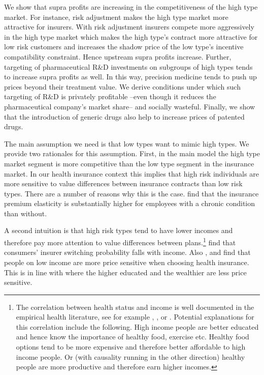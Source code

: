 \documentclass[12pt,english,a4paper]{article}
\begin{document}
We show that supra profits are increasing in the competitiveness of the high type market. For instance, risk adjustment makes the high type market more attractive for insurers. With risk adjustment insurers compete more aggressively in the high type market which makes the high type's contract more attractive for low risk customers and increases the shadow price of the low type's incentive compatibility constraint. Hence upstream supra profits increase. Further, targeting of pharmaceutical R\&D investments on subgroups of high types tends to increase supra profits as well. In this way, precision medicine tends to push up prices beyond their treatment value. We derive conditions under which such targeting of R\&D is privately profitable --even though it reduces the pharmaceutical company's market share-- and socially wasteful. Finally, we show that the introduction of generic drugs also help to increase prices of patented drugs.

The main assumption we need is that low types want to mimic high types. We provide two rationales for this assumption. First, in the main model the high type market segment is more competitive than the low type segment in the insurance market. In our health insurance context this implies that high risk individuals are more sensitive to value differences between insurance contracts than low risk types. There are a number of reasons why this is the case. \cite{Parente2004} find that the insurance premium elasticity is substantially higher for employees with a chronic condition than without. 

A second intuition is that high risk types tend to have lower incomes and therefore pay more attention to value differences between plans.\footnote{The correlation between health status and income is well documented in the empirical health literature, see for example \cite{fri05}, \cite{fin06}, \cite{gra09} or \cite{mun10}. Potential explanations for this correlation include the following. High income people are better educated and hence know the importance of healthy food, exercise etc. Healthy food options tend to be more expensive and therefore better affordable to high income people. Or (with causality running in the other direction) healthy people are more productive and therefore earn higher incomes.} \cite{hogan2017} find that consumers' insurer switching probability falls with income. Also \cite{Atherly2004}, \cite{Auerbach2006} and \cite{SALTZMAN2019197} find that people on low income are more price sensitive when choosing health insurance. This is in line with \cite{Royalty99} where the higher educated and the wealthier are less price sensitive.
\end{document}

